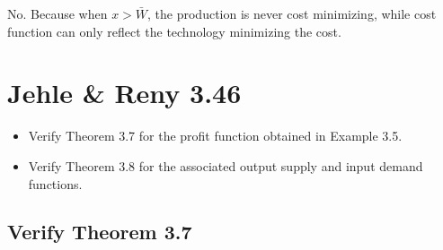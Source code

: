 \documentclass{article}
\begin{document}
No. Because when $x > \bar{W}$, the production is never cost minimizing, while  cost function can only reflect the technology minimizing the cost.

\section{Jehle \& Reny 3.46}

\begin{itemize}
\item Verify Theorem 3.7 for the profit function obtained in Example 3.5. 
\item Verify Theorem 3.8 for the associated output supply and input demand functions.
\end{itemize}
\subsection{Verify Theorem 3.7}
\end{document}
